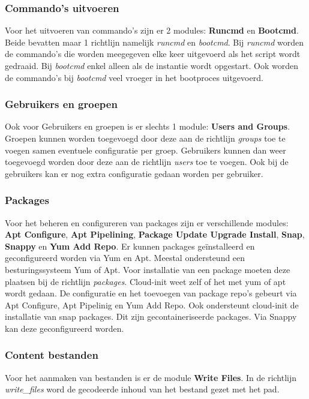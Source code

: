 \subsubsection{Commando's uitvoeren}
Voor het uitvoeren van commando's zijn er 2 modules: \textbf{Runcmd} en \textbf{Bootcmd}. Beide bevatten maar 1 richtlijn namelijk \textit{runcmd} en \textit{bootcmd}. Bij \textit{runcmd} worden de commando's die worden meegegeven elke keer uitgevoerd als het script wordt gedraaid. Bij \textit{bootcmd} enkel alleen als de instantie wordt opgestart. Ook worden de commando's bij \textit{bootcmd} veel vroeger in het bootproces uitgevoerd.

\subsubsection{Gebruikers en groepen}
Ook voor Gebruikers en groepen is er slechts 1 module: \textbf{Users and Groups}. Groepen kunnen worden toegevoegd door deze aan de richtlijn \textit{groups} toe te voegen samen eventuele configuratie per groep. Gebruikers kunnen dan weer toegevoegd worden door deze aan de richtlijn \textit{users} toe te voegen. Ook bij de gebruikers kan er nog extra configuratie gedaan worden per gebruiker.

\subsubsection{Packages}
Voor het beheren en configureren van packages zijn er verschillende modules: \textbf{Apt Configure}, \textbf{Apt Pipelining}, \textbf{Package Update Upgrade Install}, \textbf{Snap}, \textbf{Snappy} en \textbf{Yum Add Repo}. Er kunnen packages geïnstalleerd en geconfigureerd worden via Yum en Apt. Meestal ondersteund een besturingssysteem Yum of Apt. Voor installatie van een package moeten deze plaatsen bij de richtlijn \textit{packages}. Cloud-init weet zelf of het met yum of apt wordt gedaan. De configuratie en het toevoegen van package repo's gebeurt via Apt Configure, Apt Pipelinig en Yum Add Repo. Ook ondersteunt cloud-init de installatie van snap packages. Dit zijn gecontaineriseerde packages. Via Snappy kan deze geconfigureerd worden.

\subsubsection{Content bestanden}
Voor het aanmaken van bestanden is er de module \textbf{Write Files}. In de richtlijn \textit{write\_files} word de gecodeerde inhoud van het bestand gezet met het pad.

